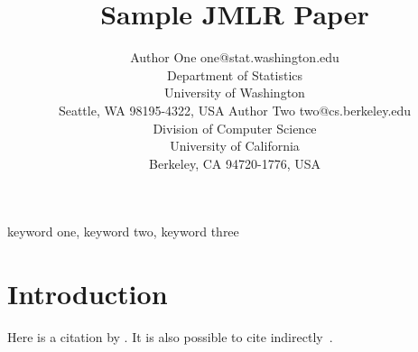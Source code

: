 \documentclass[twoside,11pt]{article}
\begin{document}
\title{Sample JMLR Paper}

\author{\name Author One \email one@stat.washington.edu \\
       \addr Department of Statistics\\
       University of Washington\\
       Seattle, WA 98195-4322, USA
       \AND
       \name Author Two \email two@cs.berkeley.edu \\
       \addr Division of Computer Science\\
       University of California\\
       Berkeley, CA 94720-1776, USA}


\maketitle

\begin{abstract}%
\blindtext
\end{abstract}

\begin{keywords}
  keyword one, keyword two, keyword three
\end{keywords}

\section{Introduction}

\blindmathpaper

Here is a citation by \citet{chow:68}. It is also possible to cite indirectly~\citep{pearl:88}.




\newpage

\appendix
\section{}
\label{app:theorem}
\end{document}
